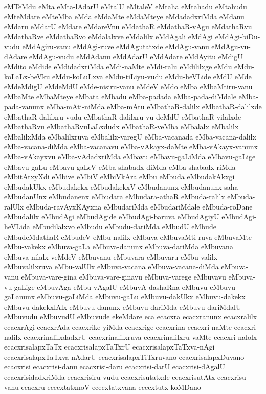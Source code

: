 {eMTeMdu
eMta
eMta-lAdarU
eMtalU
eMtaleV
eMtaha
eMtahadu
eMtahudu
eMteMdare
eMteMba
eMda
eMdaMte
eMdaMteye
eMdadadxriMda
eMdanu
eMdaru
eMdarU
eMdare
eMdareVnu
eMdathaR
eMdathaR-vAgu
eMdathaRvu
eMdathaRve
eMdathaRvo
eMdalalxve
eMdalilx
eMdAgali
eMdAgi
eMdAgi-biDu-vudu
eMdAgiru-vanu
eMdAgi-ruve
eMdAgutatxde
eMdAgu-vanu
eMdAgu-vu-dAdare
eMdAgu-vudu
eMdAdanu
eMdAdarU
eMdAdare
eMdAyitu
eMdigU
eMdito
eMdide
eMdidadxriMda
eMdi-naMte
eMdi-ralu
eMdililxge
eMdu
eMdu-koLaLx-beVku
eMdu-koLuLxva
eMdu-tiLiyu-vudu
eMdu-heVLide
eMdU
eMde
eMdeMdigU
eMdeMdU
eMde-nisiru-vanu
eMdeV
eMdo
eMba
eMbaMtiru-vanu
eMbaMte
eMbaMteye
eMbata
eMbadu
eMba-padada
eMba-pada-diMdale
eMba-pada-vanunx
eMba-mAti-niMda
eMba-mAtu
eMbathaR-dalilx
eMbathaR-dalilxde
eMbathaR-dalilxru-vudu
eMbathaR-dalilxru-vu-deMdU
eMbathaR-vilalxde
eMbathaRvu
eMbathaRvuLaLxdudx
eMbathaR-veMba
eMbalalx
eMbalilx
eMbalilxMda
eMbalilxruva
eMbalilx-varegU
eMba-vacanada
eMba-vacana-dalilx
eMba-vacana-diMda
eMba-vacanavu
eMba-vAkayx-daMte
eMba-vAkayx-vanunx
eMba-vAkayxvu
eMba-vAdadxriMda
eMbavu
eMbavu-gaLiMda
eMbavu-gaLige
eMbavu-gaLu
eMbavu-gaLeV
eMba-shabadx-diMda
eMba-shabadx-riMda
eMbitAtxyXdi
eMbive
eMbiV
eMbiVkAra
eMbu
eMbuda
eMbudakAkxgi
eMbudakUkx
eMbudakekx
eMbudakekxV
eMbudanunx
eMbudanunx-saha
eMbudanUnx
eMbudanenx
eMbudara
eMbudara-athaR
eMbuda-ralilx
eMbuda-ralUlx
eMbuda-ravAyxKAyxna
eMbudariMda
eMbudariMdale
eMbuda-roDane
eMbudalilx
eMbudAgi
eMbudAgide
eMbudAgi-baruva
eMbudAgiyU
eMbudAgi-heVLida
eMbudilalxvo
eMbudu
eMbudu-dariMda
eMbudU
eMbude
eMbudeMdathaR
eMbudeV
eMbu-nalilx
eMbuva
eMbuvaMti-ruva
eMbuvaMte
eMbu-vakekx
eMbuva-gaLa
eMbuva-danunx
eMbuva-dariMda
eMbuvana
eMbuva-nilalx-veMdeV
eMbuvanu
eMbuvara
eMbuvaru
eMbu-valilx
eMbuvalilxruva
eMbu-valUlx
eMbuva-vacana
eMbuva-vacana-diMda
eMbuva-vanu
eMbuva-vare-gina
eMbuva-vare-ginavu
eMbuva-varege
eMbuvavu
eMbuva-vu-gaLige
eMbuvAga
eMbu-vAgalU
eMbuvA-dashaRna
eMbuvu
eMbuvu-gaLanunx
eMbuvu-gaLiMda
eMbuvu-gaLu
eMbuvu-dakUkx
eMbuvu-dakekx
eMbuvu-dakekxlAlx
eMbuvu-danunx
eMbuvu-dariMda
eMbuvu-dariMdalU
eMbuvudu
eMbuvudU
eMbuvude
ekeMdare
eca
ecacxra
ecacxranunx
ecacxralilx
ecacxrAgi
ecacxrAda
ecacxrike-yiMda
ecacxrige
ecacxrina
ecacxri-naMte
ecacxri-nalilx
ecacxrinalilxdadxrU
ecacxrinalilxruva
ecacxrinalilxru-vaMte
ecacxri-nalolx
ecacxrisalapxTaTx
ecacxrisalapxTaTxrU
ecacxrisalapxTaTxva-nAgi
ecacxrisalapxTaTxva-nAdarU
ecacxrisalapxTiTxruvano
ecacxrisalapxDuvano
ecacxrisi
ecacxrisi-danu
ecacxrisi-daru
ecacxrisi-darU
ecacxrisi-dAgalU
ecacxrisidadxriMda
ecacxrisiru-vudu
ecacxrisutatxde
ecacxrisutAtx
ecacxrisu-vanu
ecacxru
ececxtatxnoV
ececxtatxvana
ececxtutx-koMDano
}

